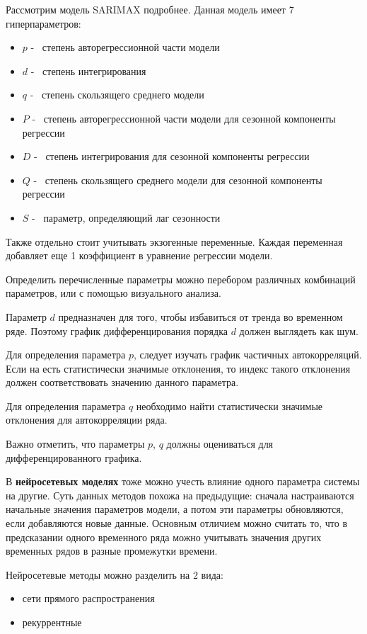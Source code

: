 Рассмотрим модель SARIMAX подробнее. Данная модель имеет 7 гиперпараметров:
\begin{itemize}
	\item $ p $ -~ степень авторегрессионной части модели
	\item $ d $ -~ степень интегрирования
	\item $ q $ -~ степень скользящего среднего модели
	\item $ P $ -~ степень авторегрессионной части модели для сезонной компоненты регрессии
	\item $ D $ -~ степень интегрирования для сезонной компоненты регрессии
	\item $ Q $ -~ степень скользящего среднего модели для сезонной компоненты регрессии
	\item $ S $ -~ параметр, определяющий лаг сезонности
\end{itemize}

Также отдельно стоит учитывать экзогенные переменные. Каждая переменная добавляет еще 1 коэффициент
в уравнение регрессии модели.

Определить перечисленные параметры можно перебором различных комбинаций параметров,
или с помощью визуального анализа.

Параметр $ d $ предназначен для того, чтобы избавиться от тренда во временном
ряде. Поэтому график дифференцирования порядка $ d $ должен выглядеть как шум.

Для определения параметра $ p $, следует изучать график частичных автокорреляций.
Если на есть статистически значимые отклонения, то индекс такого отклонения должен соответствовать
значению данного параметра.

Для определения параметра $ q $ необходимо найти статистически значимые отклонения
для автокорреляции ряда.

Важно отметить, что параметры $ p $, $ q $ должны оцениваться для дифференцированного графика.

В \textbf{нейросетевых моделях} тоже можно учесть влияние одного параметра системы на другие.
Суть данных методов похожа на предыдущие: сначала настраиваются начальные
значения параметров модели, а потом эти параметры обновляются, если добавляются новые данные.
Основным отличием можно считать то, что в предсказании одного временного ряда можно
учитывать значения других временных рядов в разные промежутки времени.

Нейросетевые методы можно разделить на 2 вида:
\begin{itemize}
	\item сети прямого распространения
	\item рекуррентные
\end{itemize}

